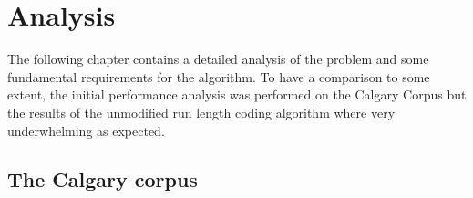 
\chapter{Analysis}
\label{ch:Analysis}

\par{
The following chapter contains a detailed analysis of the problem and some fundamental requirements for the algorithm. To have a comparison to some extent, the initial performance analysis was performed on the Calgary Corpus but the results of the unmodified run length coding algorithm where very underwhelming as expected.
}

\section{The Calgary corpus}
